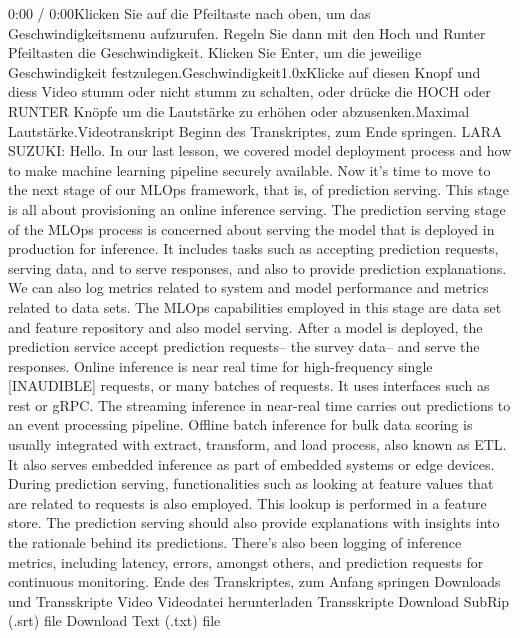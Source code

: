{{{{{{    0:00 / 0:00Klicken Sie auf die Pfeiltaste nach oben, um das Geschwindigkeitsmenu aufzurufen. Regeln Sie dann mit den Hoch und Runter Pfeiltasten die Geschwindigkeit. Klicken Sie Enter, um die jeweilige Geschwindigkeit festzulegen.Geschwindigkeit1.0xKlicke auf diesen Knopf und diess Video stumm oder nicht stumm zu schalten, oder drücke die HOCH oder RUNTER Knöpfe um die Lautstärke zu erhöhen oder abzusenken.Maximal Lautstärke.Videotranskript
    Beginn des Transkriptes, zum Ende springen.
    LARA SUZUKI: Hello.
    In our last lesson, we covered model deployment process and how to make
    machine learning pipeline securely available.
    Now it's time to move to the next stage of our MLOps framework, that is,
    of prediction serving.
    This stage is all about provisioning an online inference serving.
    The prediction serving stage of the MLOps process
    is concerned about serving the model that is
    deployed in production for inference.
    It includes tasks such as accepting prediction requests, serving data,
    and to serve responses, and also to provide prediction explanations.
    We can also log metrics related to system and model performance
    and metrics related to data sets.
    The MLOps capabilities employed in this stage
    are data set and feature repository and also model serving.
    After a model is deployed, the prediction service
    accept prediction requests-- the survey data-- and serve the responses.
    Online inference is near real time for high-frequency single [INAUDIBLE]
    requests, or many batches of requests.
    It uses interfaces such as rest or gRPC.
    The streaming inference in near-real time
    carries out predictions to an event processing pipeline.
    Offline batch inference for bulk data scoring
    is usually integrated with extract, transform, and load process,
    also known as ETL.
    It also serves embedded inference as part of embedded systems or edge
    devices.
    During prediction serving, functionalities
    such as looking at feature values that are related to requests
    is also employed.
    This lookup is performed in a feature store.
    The prediction serving should also provide explanations with insights
    into the rationale behind its predictions.
    There's also been logging of inference metrics,
    including latency, errors, amongst others, and prediction requests
    for continuous monitoring.
    Ende des Transkriptes, zum Anfang springen
    Downloads und Transskripte
    Video
    Videodatei herunterladen
    Transskripte
    Download SubRip (.srt) file
    Download Text (.txt) file        
   
}}}}}}
